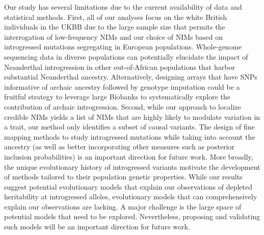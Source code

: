 Our study has several limitations due to the current availability of data and statistical methods. First, all of our analyses focus on the white British individuals in the UKBB due to the large sample size that permits the interrogation of low-frequency NIMs and our choice of NIMs based on introgressed mutations segregating in European populations. Whole-genome sequencing data in diverse populations can potentially elucidate the impact of Neanderthal introgression in other out-of-African populations that harbor substantial Neanderthal ancestry. Alternatively, designing arrays that have SNPs informative of archaic ancestry followed by genotype imputation could be a fruitful strategy to leverage large Biobanks to systematically explore the contribution of archaic introgression. Second, while our approach to localize credible NIMs yields a list of NIMs that are highly likely to modulate variation in a trait, our method only identifies a subset of causal variants. The design of fine mapping methods to study introgressed mutations while taking into account the ancestry (as well as better incorporating other measures such as posterior inclusion probabilities) is an important direction for future work. More broadly, the unique evolutionary history of introgressed variants motivate the development of methods tailored to their population genetic properties. While our results suggest potential evolutionary models that explain our observations of depleted heritability at introgressed alleles, evolutionary models that can comprehensively explain our observations are lacking. A major challenge is the large space of potential models that need to be explored. Nevertheless, proposing and validating such models will be an important direction for future work. 
\newpage
\FloatBarrier
